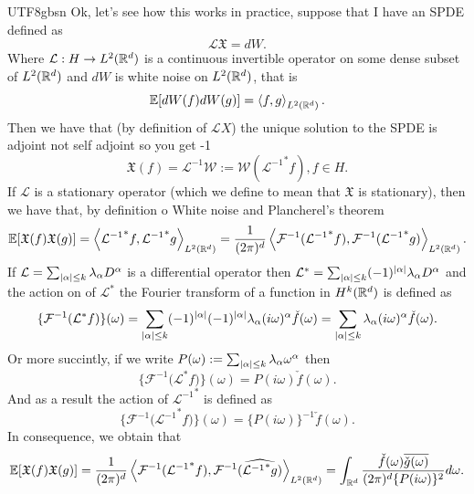 \documentclass[12pt]{article}
\newcommand{\red}[1]{{\color{red}#1}}
\newcommand{\Ww}{\mathcal{W}}\newcommand{\Aa}{\mathcal{A}}\newcommand{\Bb}{\mathcal{B}}\newcommand{\Cc}{\mathcal{C}}\newcommand{\Ee}{\mathcal{E}}\newcommand{\Ff}{\mathcal{F}}\newcommand{\Gg}{\mathcal{G}}\newcommand{\Hh}{\mathcal{H}}\newcommand{\Kk}{\mathcal{K}}\newcommand{\Ll}{\mathcal{L}}\newcommand{\Mm}{\mathcal{M}}\newcommand{\Nn}{\mathcal{N}}\newcommand{\Pp}{\mathcal{P}}\newcommand{\Qq}{\mathcal{Q}}\newcommand{\Rr}{{\mathcal R}}\newcommand{\Ss}{{\mathcal S}}\newcommand{\Tt}{{\mathcal T}}\newcommand{\Zz}{{\mathcal Z}}\newcommand{\Uu}{{\mathcal U}}
\newcommand{\br}[1]{\left\langle#1\right\rangle}
\begin{document}
\begin{CJK*}{UTF8}{gbsn}
	Ok, let's see how this works in practice, suppose that I have an SPDE defined as
	\begin{equation*}
		\Ll\mathfrak{X}=dW.
	\end{equation*}
	Where $\Ll:H\to L^2(\R^d)$ is a continuous invertible operator on some dense subset of $L^2({\mathbb R}^d)$ and $dW$ is white noise on  $L^2({\mathbb R}^d)$, that is
	\begin{equation*}
		\E[dW(f)dW(g)]=\br{f,g}_{L^2(\R^d)}.
	\end{equation*}
	Then we have that (by definition of $\Ll X$)   the unique solution to the SPDE is \red{adjoint not self adjoint so you get -1}
	\begin{equation*}
		\mathfrak{X}(f)=\mathcal{L}^{-1}\Ww:=\Ww({\Ll^{-1}}^*f), f\in H.
	\end{equation*}
	If $\Ll$ is a stationary operator (which we define to mean that $\mathfrak{X}$ is stationary), then we have that, by definition o White noise and Plancherel's theorem
	\begin{equation*}
		\E[\mathfrak{X}(f)\mathfrak{X}(g)]=\br{{\Ll^{-1}}^*f,{\Ll^{-1}}^*g}_{L^2(\R^d)}=\frac{1}{(2\pi)^d}\br{\mathcal{F}^{-1}({{\Ll^{-1}}^* f)},\mathcal{F}^{-1}({{\Ll^{-1}}^* g)}}_{L^2(\R^d)}.
	\end{equation*}
	If $\Ll=\sum _{\abs{\alpha}\leq k} \lambda _\alpha D^\alpha $ is a differential operator then $\Ll^*=\sum _{\abs{\alpha}\leq k} (-1)^\abs{\alpha}\lambda _\alpha D^\alpha $ and the action on of $\mathcal{L}^*$ the Fourier transform of a function in $H^k({\mathbb R}^d)$ is defined as
	\begin{equation*}
		\{\mathcal{F}^{-1}({\Ll^* f)}\}(\omega)= \sum _{\abs{\alpha}\leq k}(-1)^\abs{\alpha}(-1)^\abs{\alpha} \lambda _\alpha (i\omega)^\alpha \check{f}(\omega)=\sum _{\abs{\alpha}\leq k}\lambda _\alpha (i\omega)^\alpha \check{f}(\omega).
	\end{equation*}
	Or more succintly, if we write $P(\omega):=\sum _{\abs{\alpha}\leq k}\lambda _\alpha \omega^\alpha$ then
	\begin{equation*}
		\{\mathcal{F}^{-1}({\Ll^* f)}\}(\omega)=P(i\omega)\check{f}(\omega).
	\end{equation*}
	And as a result the action of ${\Ll^{-1}}^*$ is defined as
	\begin{equation*}
		\{\mathcal{F}^{-1}({{\Ll^{-1}}^* f)}\}(\omega)= \{P(i\omega)\}^{-1}\check{f}(\omega).
	\end{equation*}
	In consequence, we obtain that
	\begin{equation*}
		\E[\mathfrak{X}(f)\mathfrak{X}(g)]=\frac{1}{(2\pi)^d}\br{\mathcal{F}^{-1}({{\Ll^{-1}}^*f}),\mathcal{F}^{-1}({\widehat{{\Ll^{-1}}^*g}})}_{L^2(\R^d)}=\int_{\R^d}\frac{\check{f}(\omega)\overline{\check{g}(\omega)}}{(2\pi)^d\{P(i\omega)\}^{2}} d\omega.

\end{equation*}
\end{CJK*}
\end{document}

